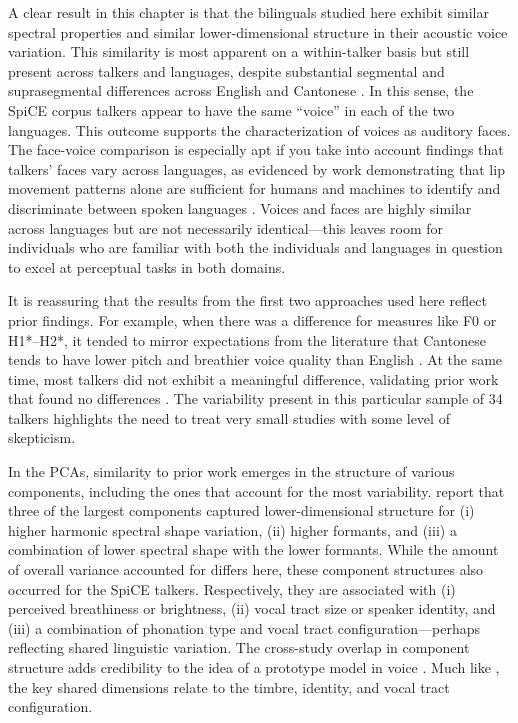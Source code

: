 A clear result in this chapter is that the bilinguals studied here exhibit similar spectral properties and similar lower-dimensional structure in their acoustic voice variation. This similarity is most apparent on a within-talker basis but still present across talkers and languages, despite substantial segmental and suprasegmental differences across English and Cantonese \citep{matthews_2013_cantonese}. In this sense, the SpiCE corpus talkers appear to have the same ``voice'' in each of the two languages. This outcome supports the characterization of voices as auditory faces. The face-voice comparison is especially apt if you take into account findings that talkers' faces vary across languages, as evidenced by work demonstrating that lip movement patterns alone are sufficient for humans and machines to identify and discriminate between spoken languages \citep{afouras_2020_now, sotofaraco_2007_discriminating}. Voices and faces are highly similar across languages but are not necessarily identical---this leaves room for individuals who are familiar with both the individuals and languages in question to excel at perceptual tasks in both domains.

It is reassuring that the results from the first two approaches used here reflect prior findings. For example, when there was a difference for measures like F0 or H1*--H2*, it tended to mirror expectations from the literature that Cantonese tends to have lower pitch and breathier voice quality than English \citep{ng_2012_ltas, ng_2010_voice}. At the same time, most talkers did not exhibit a meaningful difference, validating prior work that found no differences \citep{altenberg_2006_f0}. The variability present in this particular sample of 34 talkers highlights the need to treat very small studies with some level of skepticism.

In the PCAs, similarity to prior work emerges in the structure of various components, including the ones that account for the most variability. \citet{lee_2019_acoustic} report that three of the largest components captured lower-dimensional structure for (i) higher harmonic spectral shape variation, (ii) higher formants, and (iii) a combination of lower spectral shape with the lower formants. While the amount of overall variance accounted for differs here, these component structures also occurred for the SpiCE talkers. Respectively, they are associated with (i) perceived breathiness or brightness, (ii) vocal tract size or speaker identity, and (iii) a combination of phonation type and vocal tract configuration---perhaps reflecting shared linguistic variation. The cross-study overlap in component structure adds credibility to the idea of a prototype model in voice \citep{lavner_2001_prototype, latinus_2011_voice}. Much like \citet{lee_2019_acoustic}, the key shared dimensions relate to the timbre, identity, and vocal tract configuration.

